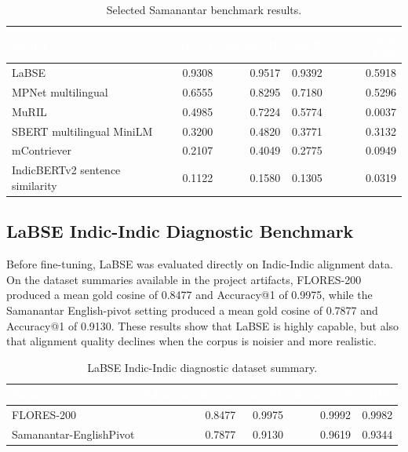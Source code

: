 \documentclass[12pt, a4paper]{article}
\begin{document}
\begin{table}[H]
\centering
\footnotesize
\renewcommand{\arraystretch}{1.25}
\begin{tabular}{p{4.5cm} r r r r}
\toprule
\rowcolor{headerblue}
\textcolor{white}{\textbf{Model}} &
\textcolor{white}{\textbf{Acc@1}} &
\textcolor{white}{\textbf{Recall@10}} &
\textcolor{white}{\textbf{MRR}} &
\textcolor{white}{\textbf{Cosine Gap}} \\
\midrule
\rowcolor{rowgray}
LaBSE & 0.9308 & 0.9517 & 0.9392 & 0.5918 \\
MPNet multilingual & 0.6555 & 0.8295 & 0.7180 & 0.5296 \\
\rowcolor{rowgray}
MuRIL & 0.4985 & 0.7224 & 0.5774 & 0.0037 \\
SBERT multilingual MiniLM & 0.3200 & 0.4820 & 0.3771 & 0.3132 \\
\rowcolor{rowgray}
mContriever & 0.2107 & 0.4049 & 0.2775 & 0.0949 \\
IndicBERTv2 sentence similarity & 0.1122 & 0.1580 & 0.1305 & 0.0319 \\
\bottomrule
\end{tabular}
\caption{Selected Samanantar benchmark results.}
\label{tab:samanantar_benchmark}
\end{table}

\subsection{LaBSE Indic-Indic Diagnostic Benchmark}

Before fine-tuning, LaBSE was evaluated directly on Indic-Indic alignment data. On the dataset summaries available in the project artifacts, FLORES-200 produced a mean gold cosine of 0.8477 and Accuracy@1 of 0.9975, while the Samanantar English-pivot setting produced a mean gold cosine of 0.7877 and Accuracy@1 of 0.9130. These results show that LaBSE is highly capable, but also that alignment quality declines when the corpus is noisier and more realistic.

\begin{table}[H]
\centering
\renewcommand{\arraystretch}{1.25}
\begin{tabular}{p{4.8cm} r r r r}
\toprule
\rowcolor{headerblue}
\textcolor{white}{\textbf{Dataset}} &
\textcolor{white}{\textbf{Mean Gold Cos.}} &
\textcolor{white}{\textbf{Acc@1}} &
\textcolor{white}{\textbf{Recall@10}} &
\textcolor{white}{\textbf{MRR}} \\
\midrule
\rowcolor{rowgray}
FLORES-200 & 0.8477 & 0.9975 & 0.9992 & 0.9982 \\
Samanantar-EnglishPivot & 0.7877 & 0.9130 & 0.9619 & 0.9344 \\
\bottomrule
\end{tabular}
\caption{LaBSE Indic-Indic diagnostic dataset summary.}
\label{tab:labse_diagnostic}
\end{table}
\end{document}
